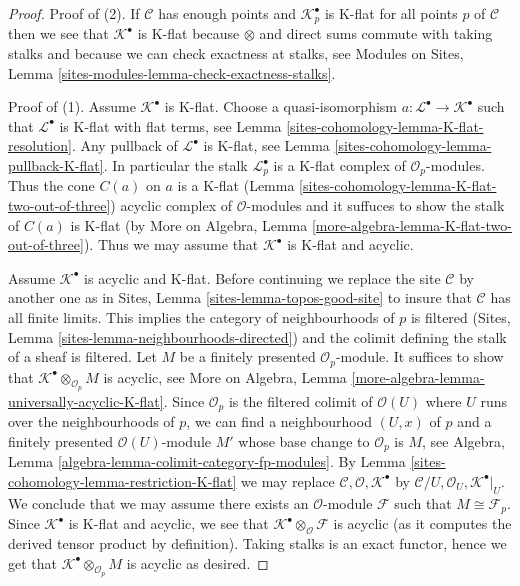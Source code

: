 \begin{proof}
Proof of (2). If $\mathcal{C}$ has enough points and
$\mathcal{K}_p^\bullet$ is K-flat for all points $p$ of $\mathcal{C}$
then we see that $\mathcal{K}^\bullet$ is K-flat because $\otimes$ and
direct sums commute with taking stalks and because we can check exactness
at stalks, see
Modules on Sites, Lemma \ref{sites-modules-lemma-check-exactness-stalks}.

\medskip\noindent
Proof of (1). Assume $\mathcal{K}^\bullet$ is K-flat.
Choose a quasi-isomorphism $a : \mathcal{L}^\bullet \to \mathcal{K}^\bullet$
such that $\mathcal{L}^\bullet$ is K-flat with flat terms, see
Lemma \ref{sites-cohomology-lemma-K-flat-resolution}. Any pullback
of $\mathcal{L}^\bullet$ is K-flat, see
Lemma \ref{sites-cohomology-lemma-pullback-K-flat}. In particular the stalk
$\mathcal{L}_p^\bullet$ is a K-flat complex of $\mathcal{O}_p$-modules.
Thus the cone $C(a)$ on $a$ is a K-flat
(Lemma \ref{sites-cohomology-lemma-K-flat-two-out-of-three})
acyclic complex of $\mathcal{O}$-modules and it suffuces
to show the stalk of $C(a)$ is K-flat
(by More on Algebra, Lemma \ref{more-algebra-lemma-K-flat-two-out-of-three}).
Thus we may assume that $\mathcal{K}^\bullet$ is K-flat and acyclic.

\medskip\noindent
Assume $\mathcal{K}^\bullet$ is acyclic and K-flat. Before continuing
we replace the site $\mathcal{C}$ by another one as in
Sites, Lemma \ref{sites-lemma-topos-good-site}
to insure that $\mathcal{C}$ has all finite
limits. This implies the category of neighbourhoods of $p$ is filtered
(Sites, Lemma \ref{sites-lemma-neighbourhoods-directed})
and the colimit defining the stalk of a sheaf is filtered.
Let $M$ be a finitely presented $\mathcal{O}_p$-module.
It suffices to show that $\mathcal{K}^\bullet \otimes_{\mathcal{O}_p} M$
is acyclic, see
More on Algebra, Lemma \ref{more-algebra-lemma-universally-acyclic-K-flat}.
Since $\mathcal{O}_p$ is the filtered colimit of $\mathcal{O}(U)$
where $U$ runs over the neighbourhoods of $p$, we
can find a neighbourhood $(U, x)$ of $p$ and a finitely
presented $\mathcal{O}(U)$-module $M'$ whose base change
to $\mathcal{O}_p$ is $M$, see
Algebra, Lemma \ref{algebra-lemma-colimit-category-fp-modules}.
By Lemma \ref{sites-cohomology-lemma-restriction-K-flat}
we may replace $\mathcal{C}, \mathcal{O}, \mathcal{K}^\bullet$
by $\mathcal{C}/U, \mathcal{O}_U, \mathcal{K}^\bullet|_U$.
We conclude that we may assume there exists an $\mathcal{O}$-module
$\mathcal{F}$ such that $M \cong \mathcal{F}_p$.
Since $\mathcal{K}^\bullet$ is K-flat and acyclic,
we see that $\mathcal{K}^\bullet \otimes_\mathcal{O} \mathcal{F}$
is acyclic (as it computes the derived tensor product by
definition). Taking stalks is an exact functor, hence we get that
$\mathcal{K}^\bullet \otimes_{\mathcal{O}_p} M$
is acyclic as desired.
\end{proof}

